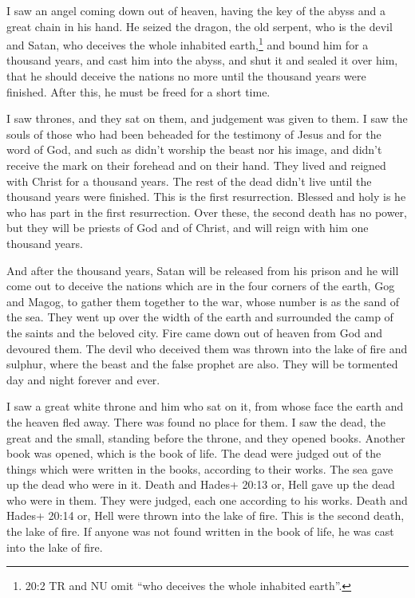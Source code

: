  I saw an angel coming down out of heaven, having the key of
the abyss and a great chain in his hand.  He seized the
dragon, the old serpent, who is the devil and Satan, who deceives the
whole inhabited earth,\footnote{20:2 TR and NU omit ``who deceives the
  whole inhabited earth''.} and bound him for a thousand years,
 and cast him into the abyss, and shut it and sealed it over
him, that he should deceive the nations no more until the thousand years
were finished. After this, he must be freed for a short time.

 I saw thrones, and they sat on them, and judgement was
given to them. I saw the souls of those who had been beheaded for the
testimony of Jesus and for the word of God, and such as didn't worship
the beast nor his image, and didn't receive the mark on their forehead
and on their hand. They lived and reigned with Christ for a thousand
years.  The rest of the dead didn't live until the thousand
years were finished. This is the first resurrection. 
Blessed and holy is he who has part in the first resurrection. Over
these, the second death has no power, but they will be priests of God
and of Christ, and will reign with him one thousand years.

 And after the thousand years, Satan will be released from
his prison  and he will come out to deceive the nations
which are in the four corners of the earth, Gog and Magog, to gather
them together to the war, whose number is as the sand of the sea.
 They went up over the width of the earth and surrounded the
camp of the saints and the beloved city. Fire came down out of heaven
from God and devoured them.  The devil who deceived them
was thrown into the lake of fire and sulphur, where the beast and the
false prophet are also. They will be tormented day and night forever and
ever.

 I saw a great white throne and him who sat on it, from
whose face the earth and the heaven fled away. There was found no place
for them.  I saw the dead, the great and the small,
standing before the throne, and they opened books. Another book was
opened, which is the book of life. The dead were judged out of the
things which were written in the books, according to their works.
 The sea gave up the dead who were in it. Death and Hades+
20:13 or, Hell gave up the dead who were in them. They were judged, each
one according to his works.  Death and Hades+ 20:14 or,
Hell were thrown into the lake of fire. This is the second death, the
lake of fire.  If anyone was not found written in the book
of life, he was cast into the lake of fire.

